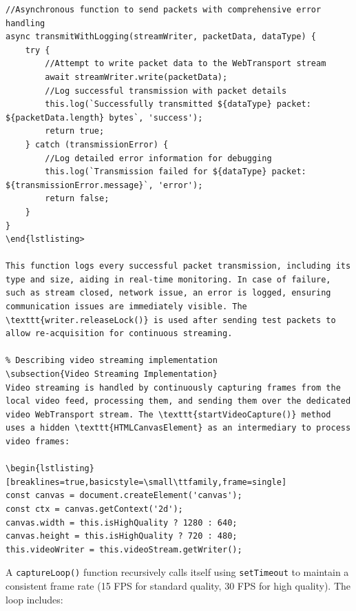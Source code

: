\begin{lstlisting}[breaklines=true,basicstyle=\small\ttfamily,frame=single]
//Asynchronous function to send packets with comprehensive error handling
async transmitWithLogging(streamWriter, packetData, dataType) {
    try {
        //Attempt to write packet data to the WebTransport stream
        await streamWriter.write(packetData);
        //Log successful transmission with packet details
        this.log(`Successfully transmitted ${dataType} packet: ${packetData.length} bytes`, 'success');
        return true;
    } catch (transmissionError) {
        //Log detailed error information for debugging
        this.log(`Transmission failed for ${dataType} packet: ${transmissionError.message}`, 'error');
        return false;
    }
}
\end{lstlisting>

This function logs every successful packet transmission, including its type and size, aiding in real-time monitoring. In case of failure, such as stream closed, network issue, an error is logged, ensuring communication issues are immediately visible. The \texttt{writer.releaseLock()} is used after sending test packets to allow re-acquisition for continuous streaming.

% Describing video streaming implementation
\subsection{Video Streaming Implementation}
Video streaming is handled by continuously capturing frames from the local video feed, processing them, and sending them over the dedicated video WebTransport stream. The \texttt{startVideoCapture()} method uses a hidden \texttt{HTMLCanvasElement} as an intermediary to process video frames:

\begin{lstlisting}[breaklines=true,basicstyle=\small\ttfamily,frame=single]
const canvas = document.createElement('canvas');
const ctx = canvas.getContext('2d');
canvas.width = this.isHighQuality ? 1280 : 640;
canvas.height = this.isHighQuality ? 720 : 480;
this.videoWriter = this.videoStream.getWriter();
\end{lstlisting}

A \texttt{captureLoop()} function recursively calls itself using \texttt{setTimeout} to maintain a consistent frame rate (15 FPS for standard quality, 30 FPS for high quality). The loop includes:

